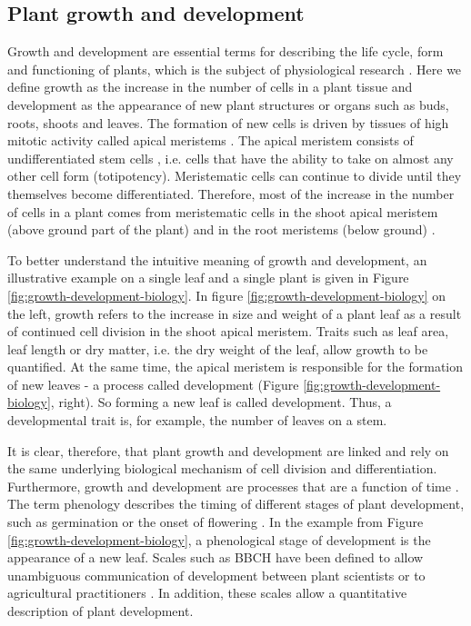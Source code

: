 \subsection{Plant growth and development}
\label{subsec:intro-plant-growth-dev}

Growth and development are essential terms for describing the life cycle, form and functioning of plants, which is the subject of physiological research \citep{leopold_plant_1964}. Here we define growth as the increase in the number of cells in a plant tissue and development as the appearance of new plant structures or organs such as buds, roots, shoots and leaves. The formation of new cells is driven by tissues of high mitotic activity called apical meristems \citep{sinnott_growth_1939}. The apical meristem consists of undifferentiated stem cells \citep{bowman_formation_2000}, i.e. cells that have the ability to take on almost any other cell form (totipotency). Meristematic cells can continue to divide until they themselves become differentiated. Therefore, most of the increase in the number of cells in a plant comes from meristematic cells in the shoot apical meristem (above ground part of the plant) and in the root meristems (below ground) \citep{kerstetter_shoot_1997}.

To better understand the intuitive meaning of growth and development, an illustrative example on a single leaf and a single plant is given in Figure \ref{fig:growth-development-biology}. In figure \ref{fig:growth-development-biology} on the left, growth refers to the increase in size and weight of a plant leaf as a result of continued cell division in the shoot apical meristem. Traits such as leaf area, leaf length or dry matter, i.e. the dry weight of the leaf, allow growth to be quantified. At the same time, the apical meristem is responsible for the formation of new leaves - a process called development (Figure \ref{fig:growth-development-biology}, right). So forming a new leaf is called development. Thus, a developmental trait is, for example, the number of leaves on a stem.

It is clear, therefore, that plant growth and development are linked and rely on the same underlying biological mechanism of cell division and differentiation. Furthermore, growth and development are processes that are a function of time \citep{prusinkiewicz_modeling_2004}. The term phenology describes the timing of different stages of plant development, such as germination or the onset of flowering \citep{piao_plant_2019}. In the example from Figure \ref{fig:growth-development-biology}, a phenological stage of development is the appearance of a new leaf. Scales such as \gls{BBCH} have been defined to allow unambiguous communication of development between plant scientists or to agricultural practitioners \citep{lancashire_uniform_1991}. In addition, these scales allow a quantitative description of plant development.

